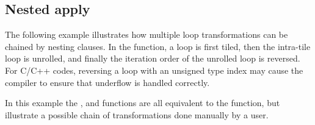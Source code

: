 


\subsection{Nested apply}

The following example illustrates how multiple loop transformations can be chained by nesting  clauses.
In the  function, a loop is first tiled, then the intra-tile
loop is unrolled, and finally the iteration order of the unrolled loop is reversed.
For C/C++ codes, reversing a loop with an unsigned type index may cause the compiler
to ensure that underflow is handled correctly.


In this example the ,  and 
functions are all equivalent to the  function, but illustrate
a possible chain of transformations done manually by a user.


